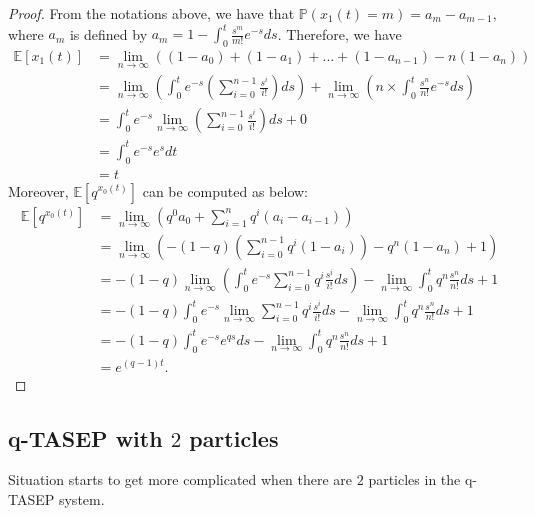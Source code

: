 \begin{proof}
From the notations above, we have that $\mathbb{P}(x_1(t) = m) = a_m - a_{m-1}$, where $a_m$ is defined by $a_m = 1 - \int_0^t \frac{s^m}{m!} e^{-s} ds$. Therefore, we have
\begin{align}
\mathbb{E}[x_1(t)] &=  \lim_{n \to \infty} ((1-a_0) + (1-a_1) + ... + (1-a_{n-1}) - n ( 1-a_n))\\
  						&= \lim_{n \to \infty} (\int_{0}^{t} e^{-s}  (\sum_{i=0}^{n-1} \frac{s^i}{i!}) ds) +\lim_{n \to \infty} (n \times \int_{0}^{t} \frac{s^n}{n!} e^{-s} ds)\\
						&=  \int_{0}^{t} e^{-s} \lim_{n \to \infty} (\sum_{i=0}^{n-1} \frac{s^i}{i!}) ds + 0\\
						&=  \int_{0}^{t} e^{-s} e^s dt\\
						&= t
\end{align}
Moreover, $\mathbb{E}[q^{x_0(t)}]$ can be computed as below: 
\begin{align}
\mathbb{E}[q^{x_0(t)}] &= \lim_{n \to \infty} (q^0  a_0 + \sum_{i=1}^{n} q^i (a_i - a_{i-1}) )\\
											 &= \lim_{n \to \infty} (-(1-q) (\sum_{i=0}^{n-1} q^i (1-a_i)) - q^n (1-a_n) + 1)\\
											 &= - (1-q) \lim_{n \to \infty} ( \int_{0}^{t} e^{-s} \sum_{i=0}^{n-1} q^i \frac{s^i}{i!} ds) - \lim_{n \to \infty} \int_0^t q^n \frac{s^n}{n!} ds + 1\\
											 &=  - (1-q) \int_0^t e^{-s }  \lim_{n \to \infty} \sum_{i=0}^{n-1} q^i \frac{s^i}{i!} ds- \lim_{n \to \infty} \int_0^t q^n \frac{s^n}{n!} ds + 1\\
				     					 &=  - (1-q) \int_0^t e^{-s } e^{qs}  ds -\lim_{n \to \infty}  \int_0^t q^n \frac{s^n}{n!} ds + 1\\
				     					 &= e^{(q-1)t}.
\end{align}
\end{proof}

\subsection{q-TASEP with $2$ particles}
Situation starts to get more complicated when there are $2$ particles in the q-TASEP system. 

